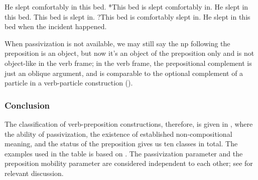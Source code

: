 \documentclass[UTF8, a4paper, oneside, scheme=plain, 12pt]{ctexbook}
\newcommand*{\citepage}[1]{p.~{#1}}
\begin{document}
\begin{exe}
    \ex\label{ex:clause.preposition.passive.adverb.1} He slept comfortably in this bed. 
    \ex\label{ex:clause.preposition.passive.adverb.1-pass} *This bed is slept comfortably in.
    \ex\label{ex:clause.preposition.passive.adverb.1-right} He slept in this bed.
    \ex\label{ex:clause.preposition.passive.adverb.1-right-pass} This bed is slept in.
    \ex ?This bed is comfortably slept in.
    \ex He slept in this bed when the incident happened.
\end{exe}

When passivization is not available,
we may still say the \acs{np} following the preposition is an object,
but now it's an object of the preposition only 
and is not object-like in the verb frame;
in the verb frame,
the prepositional complement is just an oblique argument,
and is comparable to the optional complement 
of a particle in a verb-particle construction (). 



\subsubsection{Conclusion}

The classification of verb-preposition constructions,
therefore, is given in ,
where the ability of passivization,
the existence of established non-compositional meaning, 
and the status of the preposition 
gives us ten classes in total.
The examples used in the table is based on \citet[\citepage{278}, {[17]}]{cgel}.
The passivization parameter and the preposition mobility parameter 
are considered independent to each other; 
see  for relevant discussion.
\end{document}
